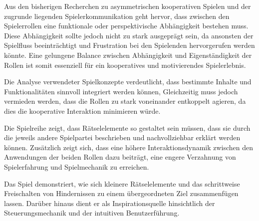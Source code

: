 



Aus den bisherigen Recherchen zu asymmetrischen kooperativen Spielen und der zugrunde liegenden Spielerkommunikation geht hervor, dass zwischen den Spielerrollen eine funktionale oder perspektivische Abhängigkeit bestehen muss. Diese Abhängigkeit sollte jedoch nicht zu stark ausgeprägt sein, da ansonsten der Spielfluss beeinträchtigt und Frustration bei den Spielenden hervorgerufen werden könnte. Eine gelungene Balance zwischen Abhängigkeit und Eigenständigkeit der Rollen ist somit essenziell für ein kooperatives und motivierendes Spielerlebnis.

Die Analyse verwendeter Spielkonzepte verdeutlicht, dass bestimmte Inhalte und Funktionalitäten sinnvoll integriert werden können, Gleichzeitig muss jedoch vermieden werden, dass die Rollen zu stark voneinander entkoppelt agieren, da dies die kooperative Interaktion minimieren würde.

Die Spielreihe  zeigt, dass Rätselelemente so gestaltet sein müssen, dass sie durch die jeweils andere Spielpartei beschrieben und nachvollziehbar erklärt werden können. Zusätzlich zeigt sich, dass eine höhere Interaktionsdynamik zwischen den Anwendungen der beiden Rollen dazu beiträgt, eine engere Verzahnung von Spielerfahrung und Spielmechanik zu erreichen.

Das Spiel  demonstriert, wie sich kleinere Rätselelemente und das schrittweise Freischalten von Hindernissen zu einem übergeordneten Ziel zusammenfügen lassen. Darüber hinaus dient er als Inspirationsquelle hinsichtlich der Steuerungsmechanik und der intuitiven Benutzerführung.

